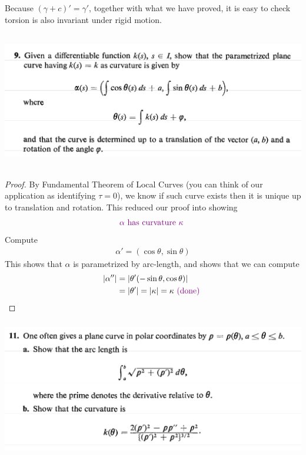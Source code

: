 \documentclass{report}
\begin{document}
Because $(\gamma +c)'=\gamma '$, together with what we have proved, it is easy to check torsion is also invariant under rigid motion. 
\begin{question}{}{}
\includegraphics[height=6cm,width=18cm]{hw2q18}
\end{question}
\begin{proof}
By Fundamental Theorem of Local Curves (you can think of our application as identifying $\tau=0$), we know if such curve exists then it is unique up to translation and rotation. This reduced our proof into showing 
\begin{align*}
\textcolor{violet}{\alpha \text{ has curvature $\kappa$ }}
\end{align*}
Compute 
\begin{align*}
\alpha '=(\cos \theta, \sin \theta)
\end{align*}
This shows that $\alpha $ is parametrized by arc-length, and shows that we can compute
\begin{align*}
\left|\alpha ''\right|&=\left|\theta ' (- \sin \theta, \cos \theta)\right|\\
&=\left|\theta'\right|=\left|\kappa\right|=\kappa \textcolor{violet}{\text{ (done) }}
\end{align*}
\end{proof}
\begin{question}{}{}
\includegraphics[height=6cm,width=18cm]{hw2q17}
\end{question}
\end{document}
